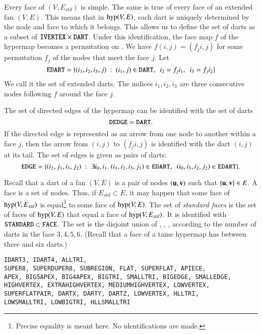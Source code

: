 \begin{definition}
Every face
of $(V,E_{std})$ is simple.  The same is true of every face of an extended fan $(V,E)$.
This means that 
in ${\operatorname{hyp}}(V,E)$, each dart is uniquely determined by the node and face to
which it belongs.  This allows us to define the set of darts  as a subset of
$\text{\tt IVERTEX}\times\text{\tt DART}$.
Under this identification, the face map $f$ of the hypermap becomes a permutation
on .  We have $f(i,j) = (f_j i,j)$ for some permutation $f_j$ of the nodes
that meet the face $j$.  Let 
\[
\text{\tt EDART} = \{(i_1,i_2,i_3,j) \ :\  (i_1,j)\in\text{\tt DART},~~ i_2 = f_j i_1,~~ i_3 = f_j i_2\}
\]
We call it the set of extended darts.  The indices $i_1,i_2,i_3$ are three consecutive
nodes following $f$ around the face $j$.
\end{definition}

\begin{definition}
The set of directed edges of the hypermap can be identified with the set of darts
\[
\text{\tt DEDGE} = \text{\tt DART}.
\]
If the directed edge is represented as an arrow from one node to another within a face $j$, then the arrow from $(i,j)$ to $(f_ji,j)$ is identified with the dart $(i,j)$
at its tail.
The set of  edges  is given as pairs of darts:
\[
\text{\tt EDGE} = \{(i_2,j_1,i_3,j_2) \ :\  \exists i_0,i_1.~
     (i_1,i_2,i_3,j_1)\in \text{\tt EDART},~~ (i_0,i_3,i_2,j_2)\in \text{\tt EDART} \}.
\]
\end{definition}

\begin{definition}
Recall that a dart of a fan $(V,E)$ is a pair of nodes $({\mathbf u},{\mathbf v})$ such that $\{{\mathbf u},{\mathbf v}\}\in E$.
A face is a set of nodes. Thus, if $E_{std}\subset E$, it may happen that some
face of ${\operatorname{hyp}}(V,E_{std})$ is equal\footnote{Precise equality is meant here. No
identifications are made.} to some face of ${\operatorname{hyp}}(V,E)$.  The set of
{\it standard faces}  is the set of  faces of ${\operatorname{hyp}}(V,E)$ that equal a face
of ${\operatorname{hyp}}(V,E_{std})$.  It is identified with $\text{\tt STANDARD}\subset\text{\tt FACE}$.
The set  is the disjoint union of
, , ,  according to the number of
darts in the face $3,4,5,6$. (Recall that a face of a tame hypermap has between
three and six darts.)
\end{definition}


\begin{verbatim}
IDART3, IDART4, ALLTRI,
SUPER8, SUPERDUPER8, SUBREGION, FLAT, SUPERFLAT, APIECE,
APEX, BIG5APEX, BIG4APEX, BIGTRI, SMALLTRI, BIGEDGE, SMALLEDGE,
HIGHVERTEX, EXTRAHIGHVERTEX, MEDIUMHIGHVERTEX, LOWVERTEX, 
SUPERFLATPAIR, DARTX, DARTY, DARTZ, LOWVERTEX, HLLTRI, 
LOWSMALLTRI, LOWBIGTRI, HLLSMALLTRI
\end{verbatim}


